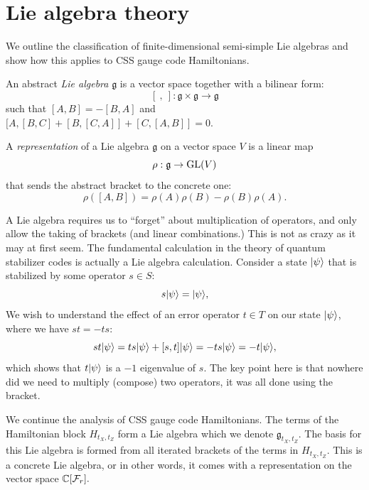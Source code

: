 %

\section{Lie algebra theory}


\def\lie{\mathfrak{g}}
\def\lieh{\mathfrak{h}}
\def\sl{\mathfrak{sl}}

We outline the classification 
of finite-dimensional semi-simple Lie algebras \cite{Fulton2013} and show
how this applies to CSS gauge code Hamiltonians.

An abstract 
\emph{Lie algebra} $\lie$ is 
a vector space together with a bilinear form:
$$
    [\ ,\  ] : \lie \times \lie \to \lie
$$
such that $[A,B] = -[B,A]$ and
$[A,[B,C]+[B,[C,A]]+[C,[A,B]]=0.$

A \emph{representation} of a Lie algebra $\lie$
on a vector space $V$ 
is a linear map
$$
    \rho : \lie \to \GL(V)
$$
that sends the abstract bracket to the concrete one:
$$
    \rho([A, B]) = \rho(A)\rho(B) - \rho(B)\rho(A).
$$

A Lie algebra requires us to ``forget'' about
multiplication of operators, and only allow the taking of brackets
(and linear combinations.)
This is not as crazy as it may at first seem.
The fundamental calculation in the theory of
quantum stabilizer codes is actually
a Lie algebra calculation.
Consider a state $|{\psi}\rangle$
that is stabilized by some operator $s\in S:$
$$
    s|{\psi}\rangle = |{\psi}\rangle,
$$
We wish to understand the effect of an error operator $t\in T$
on our state $|{\psi}\rangle$, where we have $st = -ts:$
$$
    st|{\psi}\rangle = ts|{\psi}\rangle + [s, t]|{\psi}\rangle = -ts|{\psi}\rangle = -t|{\psi}\rangle,
$$
which shows that $t|{\psi}\rangle$ is a $-1$ eigenvalue of $s.$
The key point here is that nowhere did we need to multiply (compose) two operators,
it was all done using the bracket.

We continue the analysis of CSS gauge code Hamiltonians.
The terms of the Hamiltonian block $H_{t_X,t_Z}$
form a Lie algebra which we denote $\lie_{t_X,t_Z}.$
The basis for this Lie algebra is formed from all iterated 
brackets of the terms in $H_{t_X,t_Z}.$
This is a concrete Lie algebra, or in other words, it comes
with a representation on the vector space $\mathbb{C}[\mathcal{F}_{r}].$

